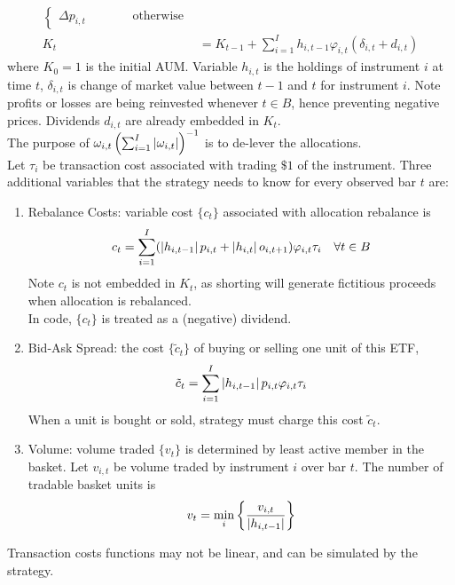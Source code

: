 \begin{method}
\begin{align}
\begin{cases}
\Delta p_{i,t} \ \ \ \ \ \ \ \ \ \ \ \ \ \ \ \ \ \text{otherwise}
\end{cases} \nonumber \\
K_t &= K_{t-1} + \sum\limits_{i=1}^I h_{i, t-1} \varphi_{i,t} (\delta_{i,t} + d_{i,t}) \nonumber
\end{align}
where $K_0 = 1$ is the initial AUM. Variable $h_{i,t}$ is the holdings of instrument $i$ at time $t$, $\delta_{i,t}$ is change of market value between $t-1$ and $t$ for instrument $i$. Note profits or losses are being reinvested whenever $t \in B$, hence preventing negative prices. Dividends $d_{i,t}$ are already embedded in $K_t$.\\
The purpose of $\omega_{i,t} \left( \sum_{i=1}^I \left\lvert\omega_{i,t}\right\rvert \right)^{-1}$ is to de-lever the allocations.\\
Let $\tau_i$ be transaction cost associated with trading $\$1$ of the instrument. Three additional variables that the strategy needs to know for every observed bar $t$ are:
\begin{enumerate}[label=\roman*.]
\setlength{\itemsep}{0pt}
\item Rebalance Costs: variable cost $\{c_t\}$ associated with allocation rebalance is
\begin{equation}
c_t = \sum\limits_{i=1}^I (\left\lvert h_{i, t-1}\right\rvert p_{i,t} + \left\lvert h_{i,t}\right\rvert o_{i, t+1}) \varphi_{i,t} \tau_{i} \ \ \ \forall t \in B \nonumber
\end{equation}
Note $c_t$ is not embedded in $K_t$, as shorting will generate fictitious proceeds when allocation is rebalanced.\\
In code, $\{c_t\}$ is treated as a (negative) dividend.
\item Bid-Ask Spread: the cost $\{ \tilde{c}_t \}$ of buying or selling one unit of this ETF,
\begin{equation}
\tilde{c}_t = \sum\limits_{i=1}^I \left\lvert h_{i, t-1}\right\rvert p_{i, t} \varphi_{i,t} \tau_i \nonumber
\end{equation}
When a unit is bought or sold, strategy must charge this cost $\tilde{c}_t$.
\item Volume: volume traded $\{v_t \}$ is determined by least active member in the basket. Let $v_{i,t}$ be volume traded by instrument $i$ over bar $t$. The number of tradable basket units is
\begin{equation}
v_t = \min_i \left\{ \frac{v_{i,t}}{\left\lvert h_{i, t-1}\right\rvert} \right\} \nonumber
\end{equation}
\end{enumerate}
Transaction costs functions may not be linear, and can be simulated by the strategy.
\end{method}

